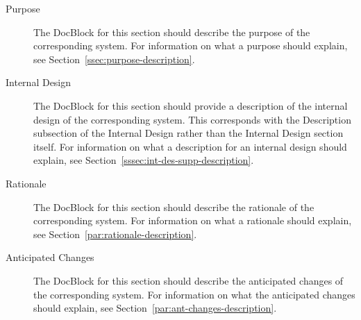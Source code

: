 \documentclass{mcscert}
\begin{document}
	\begin{description}
  	\item[Purpose\label{itm:purpose}] The \textsf{DocBlock} for this section should describe the purpose of the corresponding system. 
  	For information on what a purpose should explain, see Section~\ref{ssec:purpose-description}.
		  
	\item[Internal Design\label{itm:int-des-supp}] The \textsf{DocBlock} for this section should provide a description of the internal design of the corresponding system.
	This corresponds with the Description subsection of the Internal Design rather than the Internal Design section itself.
	For information on what a description for an internal design should explain, see Section~\ref{sssec:int-des-supp-description}. 

		\item[Rationale\label{itm:rationale}] The \textsf{DocBlock} for this section should describe the rationale of the corresponding system. 
		For information on what a rationale should explain, see Section~\ref{par:rationale-description}.

  	  \item[Anticipated Changes\label{itm:ant-changes}] The
  	  \textsf{DocBlock} for this section should describe the anticipated changes of the corresponding system.
  	  For information on what the anticipated changes should explain, see
  	  Section~\ref{par:ant-changes-description}.


\end{description}
\end{document}
